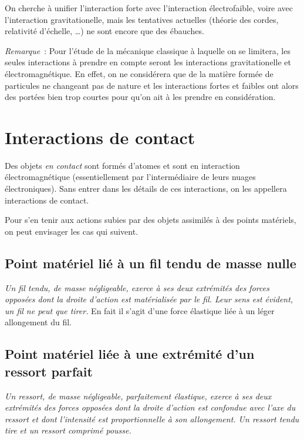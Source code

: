 On cherche à unifier l'interaction forte avec l'interaction électrofaible, voire avec l'interaction gravitationelle, mais les tentatives actuelles (théorie des cordes, relativité d'échelle, \ldots) ne sont encore que des ébauches.

\emph{Remarque}~: Pour l'étude de la mécanique classique à laquelle on se limitera, les seules interactions à prendre en compte seront les interactions gravitationelle et électromagnétique. En effet, on ne considérera que de la matière formée de particules ne changeant pas de nature et les interactions fortes et faibles ont alors des portées bien trop courtes pour qu'on ait à les prendre en considération.

\section{Interactions de contact}
\label{chap2-sec:interactiondecontac}

Des objets \emph{en contact} sont formés d'atomes et sont en interaction électromagnétique (essentiellement par l'intermédiaire de leurs nuages électroniques). Sans entrer dans les détails de ces interactions, on les appellera interactions de contact.

Pour s'en tenir aux actions subies par des objets assimilés à des points matériels, on peut envisager les cas qui suivent.

\subsection{Point matériel lié à un fil tendu de masse nulle}
\label{chap2-subsec:filtendu}

\emph{Un fil tendu, de masse négligeable, exerce à ses deux extrémités des forces opposées dont la droite d'action est matérialisée par le fil. Leur sens est évident, un fil ne peut que tirer.} En fait il s'agit d'une force élastique liée à un léger allongement du fil.

\subsection{Point matériel liée à une extrémité d'un ressort parfait}
\label{chap2-subsec:ressort}

\emph{Un ressort, de masse négligeable, parfaitement élastique, exerce à ses deux extrémités des forces opposées dont la droite d'action est confondue avec l'axe du ressort et dont l'intensité est proportionnelle à son allongement. Un ressort tendu tire et un ressort comprimé pousse.}

